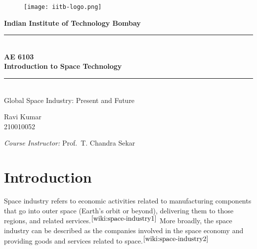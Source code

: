 \documentclass[12pt]{article}
\begin{document}
\begin{figure}
    \centering
    \texttt{[image: iitb-logo.png]}
\end{figure}

\begin{center}
    \textbf{\LARGE Indian Institute of Technology Bombay} \\
    \vspace{1cm}
    \vspace{0.3cm}

    \rule{\linewidth}{0.5pt} \\
    \vspace{0.2cm}
    \textbf{\LARGE AE 6103 \\ \vspace{0.3cm} Introduction to Space Technology} \\
    \vspace{0.1cm}
    \rule{\linewidth}{0.5pt} \\
    \vspace{1.5cm}
    \LARGE Global Space Industry: Present and Future\\

    \vspace{2cm}

    \normalsize Ravi Kumar \\
    210010052

    \vspace{3cm}

    \normalsize\textit{Course Instructor:}\vspace{0.2cm}
    Prof.\ T. Chandra Sekar

    \vspace{1cm}
    \date{}
\end{center}

\newpage

\tableofcontents

\newpage

\section{Introduction}

Space industry refers to economic activities related to manufacturing
components that go into outer space (Earth's orbit or beyond), delivering them
to those regions, and related services.$^{\cite{wiki:space-industry1}}$ More
broadly, the space industry can be described as the companies involved in the
space economy and providing goods and services related to
space.$^{\cite{wiki:space-industry2}}$
\end{document}
